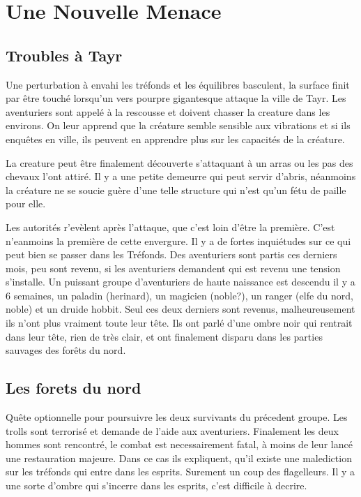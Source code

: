 \section{Une Nouvelle Menace}

\subsection*{Troubles à Tayr}

Une perturbation à envahi les tréfonds et les équilibres basculent, la surface 
finit par être touché lorsqu'un vers pourpre gigantesque attaque la ville de 
Tayr. Les aventuriers sont appelé à la rescousse et doivent chasser la creature 
dans les environs. On leur apprend que la créature semble sensible aux vibrations
et si ils enquêtes en ville, ils peuvent en apprendre plus sur les capacités de 
la créature.

La creature peut être finalement découverte s'attaquant à un arras ou les pas
des chevaux l'ont attiré. Il y a une petite demeurre qui peut servir d'abris,
néanmoins la créature ne se soucie guère d'une telle structure qui n'est qu'un 
fétu de paille pour elle. 

Les autorités r'evèlent après l'attaque, que c'est loin d'être la première.
C'est n'eanmoins la première de cette envergure. Il y a de fortes inquiétudes
sur ce qui peut bien se passer dans les Tréfonds. Des aventuriers sont partis
ces derniers mois, peu sont revenu, si les aventuriers demandent qui est revenu
une tension s'installe. Un puissant groupe d'aventuriers de haute naissance 
est descendu il y a 6 semaines,
un paladin (herinard), un magicien (noble?), un ranger (elfe du nord, noble)
et un druide hobbit. Seul ces deux derniers sont revenus, malheureusement ils n'ont
plus vraiment toute leur tête. Ils ont parlé d'une ombre noir qui rentrait dans 
leur tête, rien de très clair, et ont finalement disparu dans les parties sauvages
des forêts du nord.

\subsection*{Les forets du nord}

Quête optionnelle pour poursuivre les deux survivants du précedent groupe. Les
trolls sont terrorisé et demande de l'aide aux aventuriers. Finalement les 
deux hommes sont rencontré, le combat est necessairement fatal, à moins de
leur lancé une restauration majeure. Dans ce cas ils expliquent, qu'il existe
une malediction sur les tréfonds qui entre dans les esprits. Surement un coup
des flagelleurs. Il y a une sorte d'ombre qui s'incerre dans les esprits, c'est 
difficile à decrire.

